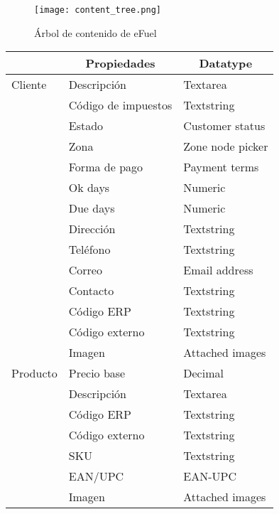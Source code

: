 \begin{figure}[h]
    \texttt{[image: content\_tree.png]}
    \caption{Árbol de contenido de eFuel}
    \label{fig:content_tree}
    \centering
\end{figure}

\begin{longtable}{ | p{5em} | l | l | }
    \hline
    \rowcolor{gray!30}
    \multicolumn{1}{|c|}{Doctype} &
    \multicolumn{1}{|c|}{Propiedades} &
    \multicolumn{1}{|c|}{Datatype} \\
    \hline
    \endhead

    \hline
    \endfoot

    \endlastfoot

    Cliente
        & Descripción & Textarea \\
        \cline{2-3}
        & Código de impuestos & Textstring \\
        \cline{2-3}
        & Estado & Customer status \\
        \cline{2-3}
        & Zona & Zone node picker \\
        \cline{2-3}
        & Forma de pago & Payment terms \\
        \cline{2-3}
        & Ok days & Numeric \\
        \cline{2-3}
        & Due days & Numeric \\
        \cline{2-3}
        & Dirección & Textstring \\
        \cline{2-3}
        & Teléfono & Textstring \\
        \cline{2-3}
        & Correo & Email address \\
        \cline{2-3}
        & Contacto & Textstring \\
        \cline{2-3}
        & Código ERP & Textstring \\
        \cline{2-3}
        & Código externo & Textstring \\
        \cline{2-3}
        & Imagen & Attached images \\
    \hline

    Producto
        & Precio base & Decimal \\
        \cline{2-3}
        & Descripción & Textarea \\
        \cline{2-3}
        & Código ERP & Textstring \\
        \cline{2-3}
        & Código externo & Textstring \\
        \cline{2-3}
        & SKU & Textstring \\
        \cline{2-3}
        & EAN/UPC & EAN-UPC \\
        \cline{2-3}
        & Imagen & Attached images \\
    \hline


\end{longtable}
